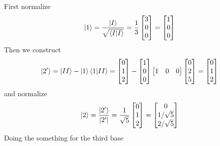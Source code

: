 \documentclass[../main.tex]{subfiles}
\begin{document}
First normalize
\begin{equation*}
	\ket{1}=\frac{\ket{I}}{\sqrt{\braket{I|I}}}=\frac{1}{3}\begin{bmatrix}
		3 \\0\\0
	\end{bmatrix}=\begin{bmatrix}
		1 \\0\\0
	\end{bmatrix}
\end{equation*}
Then we construct
\begin{equation*}
	\ket{2'}=\ket{II}-\ket{1}\braket{1|II}=\begin{bmatrix}
		0 \\1\\2
	\end{bmatrix}
	-
	\begin{bmatrix}
		1 \\0\\0
	\end{bmatrix}
	\begin{bmatrix}
		1 & 0 & 0
	\end{bmatrix}
	\begin{bmatrix}
		0 \\2\\5
	\end{bmatrix}
	=
	\begin{bmatrix}
		0 \\1\\2
	\end{bmatrix}
\end{equation*}
and normalize
\begin{equation*}
	\ket{2}=\frac{\ket{2'}}{|2'|}=\frac{1}{\sqrt{5}}\begin{bmatrix}
		0 \\1\\2
	\end{bmatrix}=
	\begin{bmatrix}
		0 \\1/\sqrt{5}\\2/\sqrt{5}
	\end{bmatrix}
\end{equation*}
Doing the something for the third base
\end{document}
